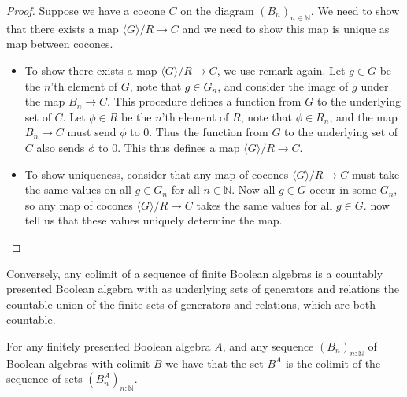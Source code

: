 \documentclass{../util/zariski-small}
\begin{document}
\begin{proof}
  Suppose we have a cocone $C$ on the diagram $(B_n)_{n\in\mathbb N}$. 
  We need to show that there exists a map $\langle G \rangle / R\to C$ and
  we need to show this map is unique as map between cocones. 
  \begin{itemize}
    \item To show there exists a map $\langle G \rangle / R \to C$, 
      we use remark  again. 
      Let $g\in G$ be the $n$'th element of $G$, 
      note that $g\in G_n$, and consider the image of $g$ under the map $B_n \to C$. 
      This procedure defines a function from $G$ to the underlying set of $C$. 
      Let $\phi \in R$ be the $n$'th element of $R$, 
      note that $\phi \in R_n$, and the map $B_n \to C$ must send $\phi$ to $0$. 
      Thus the function from $G$ to the underlying set of $C$ also sends $\phi$ to $0$. 
      This thus defines a map $\langle G \rangle / R \to C$. 
    \item To show uniqueness, consider that any map of cocones $\langle G \rangle /R \to C$ 
      must take the same values on all $g\in G_n$ for all $n\in\mathbb N$. 
      Now all $g\in G$ occur in some $G_n$, so any map of cocones $\langle G \rangle /R \to C$ 
      takes the same values for all $g\in G$. 
       now tell us that these values uniquely determine the map. 
  \end{itemize}
\end{proof}
\begin{remark}
  Conversely, any colimit of a sequence of finite Boolean algebras 
  is a countably presented Boolean algebra with 
  as underlying sets of generators and relations the countable union of the finite sets of 
  generators and relations, which are both countable. 
\end{remark}
\begin{lemma}\label{lemFinitelyPresentedBACompact}
  For any finitely presented Boolean algebra $A$,
  and any sequence $(B_n)_{n:\mathbb N}$ of Boolean algebras with colimit $B$
  we have that the set $B^A$ is the colimit of the sequence of sets $(B_n^A)_{n:\mathbb N}$. 
\end{lemma}  
\end{document}
